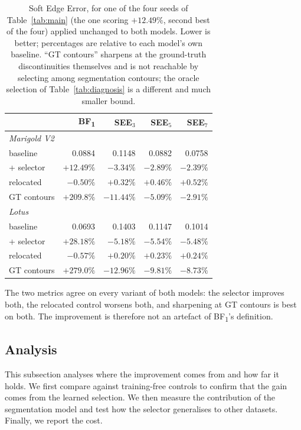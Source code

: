 \documentclass[conference]{IEEEtran}
\newcommand{\bfone}{BF\textsubscript{1}}
\begin{document}
\begin{table}[t]
\caption{Soft Edge Error, for one of the four seeds of Table~\ref{tab:main} (the one scoring $+12.49\%$, second best of the four) applied unchanged to
both models. Lower is
better; percentages are relative to each model's own baseline. ``GT contours''
sharpens at the ground-truth discontinuities themselves and is not reachable by
selecting among segmentation contours; the oracle selection of
Table~\ref{tab:diagnosis} is a different and much smaller bound.}
\label{tab:see}
\centering
\begin{tabular}{lrrrr}
\toprule
& \bfone{} & SEE$_3$ & SEE$_5$ & SEE$_7$ \\
\midrule
\multicolumn{5}{l}{\emph{Marigold V2}} \\
baseline        & 0.0884 & 0.1148 & 0.0882 & 0.0758 \\
+ selector      & $+12.49\%$  & $-3.34\%$  & $-2.89\%$ & $-2.39\%$ \\
relocated       & $-0.50\%$   & $+0.32\%$  & $+0.46\%$ & $+0.52\%$ \\
GT contours     & $+209.8\%$  & $-11.44\%$ & $-5.09\%$ & $-2.91\%$ \\
\midrule
\multicolumn{5}{l}{\emph{Lotus}} \\
baseline        & 0.0693 & 0.1403 & 0.1147 & 0.1014 \\
+ selector      & $+28.18\%$  & $-5.18\%$  & $-5.54\%$ & $-5.48\%$ \\
relocated       & $-0.57\%$   & $+0.20\%$  & $+0.23\%$ & $+0.24\%$ \\
GT contours     & $+279.0\%$  & $-12.96\%$ & $-9.81\%$ & $-8.73\%$ \\
\bottomrule
\end{tabular}
\end{table}

The two metrics agree on every variant of both models: the selector improves
both, the relocated control worsens both, and sharpening at GT contours is best
on both. The improvement is therefore not an artefact of \bfone{}'s definition.

\subsection{Analysis}

This subsection analyses where the improvement comes from and how far it
holds. We first compare against training-free controls to confirm that the gain
comes from the learned selection. We then measure the contribution of the
segmentation model and test how the selector generalises to other datasets.
Finally, we report the cost.
\end{document}
